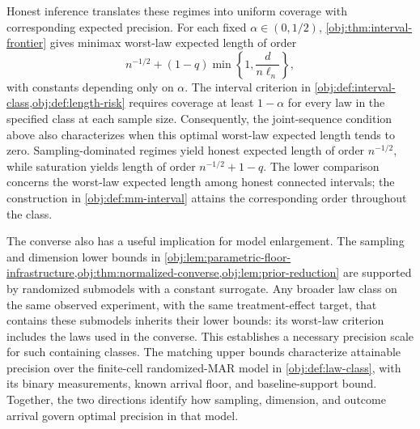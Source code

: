 Honest inference translates these regimes into uniform coverage with corresponding expected precision. For each fixed \(\alpha\in(0,1/2)\), \cref{obj:thm:interval-frontier} gives minimax worst-law expected length of order
\[
n^{-1/2}+(1-q)\min\left\{1,\frac{d}{n\ell_n}\right\},
\]
with constants depending only on \(\alpha\). The interval criterion in \cref{obj:def:interval-class,obj:def:length-risk} requires coverage at least \(1-\alpha\) for every law in the specified class at each sample size. Consequently, the joint-sequence condition above also characterizes when this optimal worst-law expected length tends to zero. Sampling-dominated regimes yield honest expected length of order \(n^{-1/2}\), while saturation yields length of order \(n^{-1/2}+1-q\). The lower comparison concerns the worst-law expected length among honest connected intervals; the construction in \cref{obj:def:mm-interval} attains the corresponding order throughout the class.

The converse also has a useful implication for model enlargement. The sampling and dimension lower bounds in \cref{obj:lem:parametric-floor-infrastructure,obj:thm:normalized-converse,obj:lem:prior-reduction} are supported by randomized submodels with a constant surrogate. Any broader law class on the same observed experiment, with the same treatment-effect target, that contains these submodels inherits their lower bounds: its worst-law criterion includes the laws used in the converse. This establishes a necessary precision scale for such containing classes. The matching upper bounds characterize attainable precision over the finite-cell randomized-MAR model in \cref{obj:def:law-class}, with its binary measurements, known arrival floor, and baseline-support bound. Together, the two directions identify how sampling, dimension, and outcome arrival govern optimal precision in that model.
